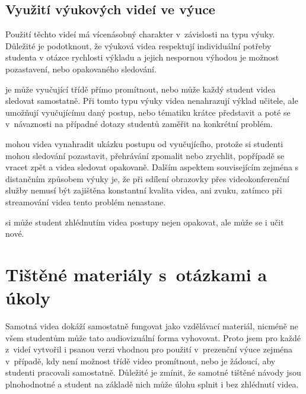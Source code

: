 \subsection{Využití výukových videí ve výuce}
Použití těchto videí má vícenásobný charakter v~závislosti na typu výuky. 
Důležité je podotknout, že výuková videa respektují individuální potřeby studenta v otázce rychlosti výkladu a jejich nespornou výhodou je možnost pozastavení, nebo opakovaného sledování.

\noindent{} je může vyučující třídě přímo promítnout, nebo může každý student videa sledovat samostatně. Při tomto typu výuky videa nenahrazují výklad učitele, ale umožňují vyučujícímu daný postup, nebo tématiku krátce představit a poté se v~návaznosti na případné dotazy studentů zaměřit na konkrétní problém.

\noindent{} mohou videa vynahradit ukázku postupu od vyučujícího, protože si studenti mohou sledování pozastavit, přehrávání zpomalit nebo zrychlit, popřípadě se vracet zpět a videa sledovat opakovaně. 
Dalším aspektem souvisejícím zejména s distančním způsobem výuky je, že při sdílení obrazovky přes videokonferenční služby nemusí být zajištěna konstantní kvalita videa, ani zvuku, zatímco při streamování videa tento problém nenastane. 

\noindent{} si může student zhlédnutím videa postupy nejen opakovat, ale může se i učit nové. 

\section{Tištěné materiály s~otázkami a úkoly}
Samotná videa dokáží samostatně fungovat jako vzdělávací materiál, nicméně ne všem studentům může tato audiovizuální forma vyhovovat.
Proto jsem pro každé z~videí vytvořil i psanou verzi vhodnou pro použití v~prezenční výuce zejména v~případě, kdy není možnost třídě video promítnout, nebo je žádoucí, aby studenti pracovali samostatně. 
Důležité je zmínit, že samotné tištěné návody jsou plnohodnotné a student na základě nich může úlohu splnit i bez zhlédnutí videa. 

